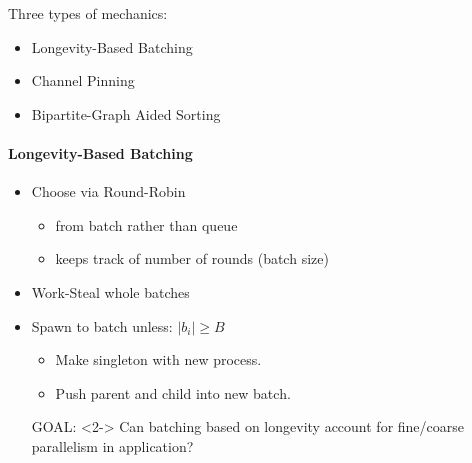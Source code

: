 \begin{slide}
    Three types of mechanics:
    \begin{itemize}
        \item Longevity-Based Batching
        \item Channel Pinning
        \item Bipartite-Graph Aided Sorting
    \end{itemize}

\end{slide}

\begin{slide}
    \framesubtitle{Longevity-Based Batching}

    \begin{itemize}
        \item Choose via Round-Robin 
            \begin{itemize}
                \item from batch rather than queue
                \item keeps track of number of rounds (batch size)
            \end{itemize}

        \item Work-Steal whole batches

        \item Spawn to batch unless: $|b_i| \geq B$
            \begin{itemize}
                \item Make singleton with new process.
                \item Push parent and child into new batch.
            \end{itemize}

        \item[GOAL:]<2-> Can batching based on longevity account for fine/coarse
            parallelism in application? 

     \end{itemize}    
    

\end{slide}
